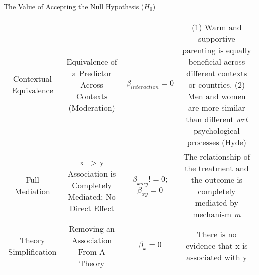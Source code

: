 \documentclass[ignorenonframetext,]{beamer}
\begin{document}
\begin{frame}{The Value of Accepting the Null Hypothesis (\(H_0\))}
\begin{longtable}[]{@{}cccc@{}}
\begin{minipage}[t]{0.21\columnwidth}
Contextual Equivalence\strut
\end{minipage} & \begin{minipage}[t]{0.20\columnwidth}\centering
Equivalence of a Predictor Across Contexts (Moderation)\strut
\end{minipage} & \begin{minipage}[t]{0.25\columnwidth}\centering
\(β_{interaction} = 0\)\strut
\end{minipage} & \begin{minipage}[t]{0.20\columnwidth}\centering
(1) Warm and supportive parenting is equally beneficial across different
contexts or countries. (2) Men and women are more similar than different
\emph{wrt} psychological processes (Hyde)\strut
\end{minipage}\tabularnewline
\begin{minipage}[t]{0.21\columnwidth}\centering
Full Mediation\strut
\end{minipage} & \begin{minipage}[t]{0.20\columnwidth}\centering
x --\textgreater{} y Association is Completely Mediated; No Direct
Effect\strut
\end{minipage} & \begin{minipage}[t]{0.25\columnwidth}\centering
\(β_{xmy} != 0\); \(β_{xy} = 0\)\strut
\end{minipage} & \begin{minipage}[t]{0.20\columnwidth}\centering
The relationship of the treatment and the outcome is completely mediated
by mechanism \emph{m}\strut
\end{minipage}\tabularnewline
\begin{minipage}[t]{0.21\columnwidth}\centering
Theory Simplification\strut
\end{minipage} & \begin{minipage}[t]{0.20\columnwidth}\centering
Removing an Association From A Theory\strut
\end{minipage} & \begin{minipage}[t]{0.25\columnwidth}\centering
\(β_x = 0\)\strut
\end{minipage} & \begin{minipage}[t]{0.20\columnwidth}\centering
There is no evidence that x is associated with y\strut
\end{minipage}\tabularnewline
\bottomrule
\end{longtable}

\end{frame}
\end{document}
